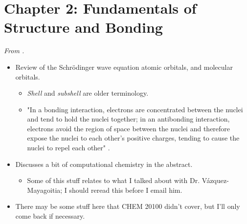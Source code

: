 \documentclass[../notes.tex]{subfiles}
\begin{document}
\section{Chapter 2: Fundamentals of Structure and Bonding}
\emph{From \textcite{bib:SpessardMiessler}.}
\begin{itemize}
    \item Review of the Schr\"{o}dinger wave equation atomic orbitals, and molecular orbitals.
    \begin{itemize}
        \item \emph{Shell} and \emph{subshell} are older terminology.
        \item "In a bonding interaction, electrons are concentrated between the nuclei and tend to hold the nuclei together; in an antibonding interaction, electrons avoid the region of space between  the nuclei and therefore expose the nuclei to each other's positive charges, tending to cause the nuclei to repel each other" \parencite[18]{bib:SpessardMiessler}.
    \end{itemize}
    \item Discusses a bit of computational chemistry in the abstract.
    \begin{itemize}
        \item Some of this stuff relates to what I talked about with Dr. V\'{a}zquez-Mayagoitia; I should reread this before I email him.
    \end{itemize}
    \item There may be some stuff here that CHEM 20100 didn't cover, but I'll only come back if necessary.
\end{itemize}
\end{document}
